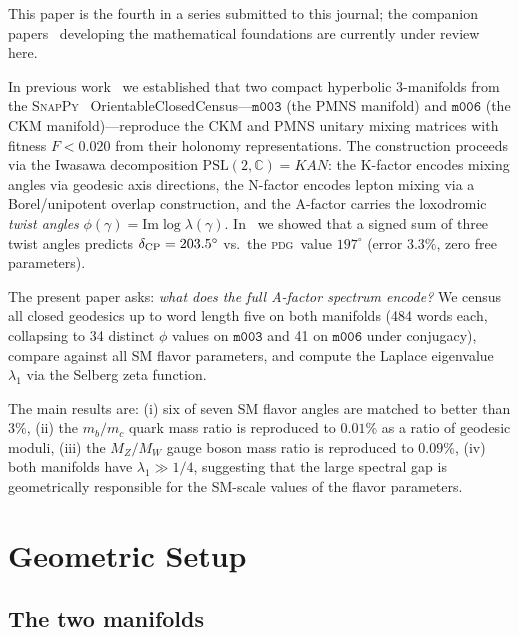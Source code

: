 ﻿\documentclass[aps,prd,twocolumn,longbibliography]{revtex4-2}
\newcommand{\PSL}{\mathrm{PSL}(2,\mathbb{C})}
\newcommand{\mfld}[1]{\texttt{#1}}
\newcommand{\degr}{^{\circ}}
\newcommand{\PDG}{\textsc{pdg}}
\begin{document}
This paper is the fourth in a series submitted to this journal; the companion papers~\cite{GentryNPB1,GentryNPB2,GentryNPB3} developing the mathematical foundations are currently under review here.

In previous work~\cite{GentryCKM,GentryPMNS,GentryCP} we established that
two compact hyperbolic 3-manifolds from the \textsc{SnapPy}~\cite{SnapPy}
OrientableClosedCensus---$\mfld{m003}$ (the PMNS manifold) and $\mfld{m006}$
(the CKM manifold)---reproduce the CKM and PMNS unitary mixing matrices with
fitness $F < 0.020$ from their holonomy representations.
The construction proceeds via the Iwasawa decomposition
$\PSL = KAN$: the K-factor encodes mixing angles via geodesic axis directions,
the N-factor encodes lepton mixing via a Borel/unipotent overlap construction,
and the A-factor carries the loxodromic \emph{twist angles}
$\phi(\gamma) = \mathrm{Im}\log\lambda(\gamma)$.
In~\cite{GentryCP} we showed that a signed sum of three twist angles predicts
$\delta_{\rm CP} = 203.5\degr$ vs.\ the \PDG\ value $197\degr$ (error $3.3\%$,
zero free parameters).

The present paper asks: \emph{what does the full A-factor spectrum encode?}
We census all closed geodesics up to word length five on both manifolds
(484 words each, collapsing to 34 distinct $\phi$ values on $\mfld{m003}$
and 41 on $\mfld{m006}$ under conjugacy), compare against all SM flavor
parameters, and compute the Laplace eigenvalue $\lambda_1$ via the Selberg
zeta function.

The main results are:
(i) six of seven SM flavor angles are matched to better than $3\%$,
(ii) the $m_b/m_c$ quark mass ratio is reproduced to $0.01\%$ as a ratio of
geodesic moduli,
(iii) the $M_Z/M_W$ gauge boson mass ratio is reproduced to $0.09\%$,
(iv) both manifolds have $\lambda_1 \gg 1/4$, suggesting that the large spectral
gap is geometrically responsible for the SM-scale values of the flavor parameters.

\section{Geometric Setup}
\label{sec:setup}

\subsection{The two manifolds}
\end{document}
